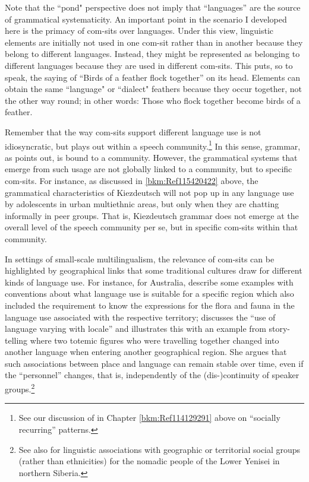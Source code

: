 Note that the “pond" perspective does not imply that ``languages'' are the source of grammatical systematicity. An important point in the scenario I developed here is the primacy of com-sits over languages. Under this view, linguistic elements are initially not used in one com-sit rather than in another because they belong to different languages. Instead, they might be represented as belonging to different languages because they are used in different com-sits. This puts, so to speak, the saying of “Birds of a feather flock together” on its head. Elements can obtain the same “language" or “dialect" feathers because they occur together, not the other way round; in other words: Those who flock together become birds of a feather.

Remember that the way com-sits support different language use is not idiosyncratic, but plays out within a speech community.\footnote{See our discussion of \citet{LüdelingEtAl2019} in Chapter \ref{bkm:Ref114129291} above on “socially recurring” patterns.} In this sense, grammar, as \citet{Höder2018} points out, is bound to a community. However, the grammatical systems that emerge from such usage are not globally linked to a community, but to specific com-sits. For instance, as discussed in \ref{bkm:Ref115420422} above, the grammatical characteristics of Kiezdeutsch will not pop up in any language use by adolescents in urban multiethnic areas, but only when they are chatting informally in peer groups. That is, Kiezdeutsch grammar does not emerge at the overall level of the speech community per se, but in specific com-sits within that community.

In settings of small-scale multilingualism, the relevance of com-sits can be highlighted by geographical links that some traditional cultures draw for different kinds of language use. For instance, for Australia, \citet{PakendorfEtAl2021} describe some examples with conventions about what language use is suitable for a specific region which also included the requirement to know the expressions for the flora and fauna in the language use associated with the respective territory; \citet[146]{Merlan1981} discusses the “use of language varying with locale” and illustrates this with an example from story-telling where two totemic figures who were travelling together changed into another language when entering another geographical region. She argues that such associations between place and language can remain stable over time, even if the “personnel” changes, that is, independently of the (dis-)continuity of speaker groups.\footnote{See also \citet{Khanina2021} for linguistic associations with geographic or territorial social groups (rather than ethnicities) for the nomadic people of the Lower Yenisei in northern Siberia.}

